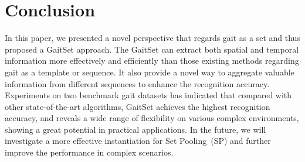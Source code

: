 \ifx\allinone\undefined


\fi

\section{Conclusion}
\label{sec:con}
In this paper, we presented a novel perspective that regards gait as a set and thus proposed a GaitSet approach. The GaitSet can extract both spatial and temporal information more effectively and efficiently than those existing methods regarding gait as a template or sequence.
It also provide a novel way to aggregate valuable information from different sequences to enhance the recognition accuracy.
Experiments on two benchmark gait datasets has indicated that compared with other state-of-the-art algorithms, GaitSet achieves the highest recognition accuracy, and reveals a wide range of flexibility on various complex environments, showing a great potential in practical applications. In the future, we will investigate a more effective instantiation for Set Pooling~(SP) and further improve the performance in complex scenarios.

\ifx\allinone\undefined

